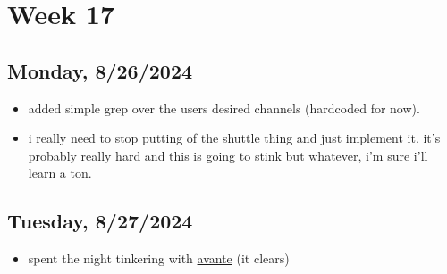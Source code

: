 \newpage
\section{Week 17}

\subsection*{Monday, 8/26/2024}
\begin{itemize}
    \item added simple grep over the users desired channels (hardcoded for now).
    \item i really need to stop putting of the shuttle thing and just implement
        it. it's probably really hard and this is going to stink but whatever,
        i'm sure i'll learn a ton.
\end{itemize}

\subsection*{Tuesday, 8/27/2024}
\begin{itemize}
    \item spent the night tinkering with 
        \textcolor{blue}{\href{https://github.com/yetone/avante.nvim}{avante}} 
        (it clears)
\end{itemize}
